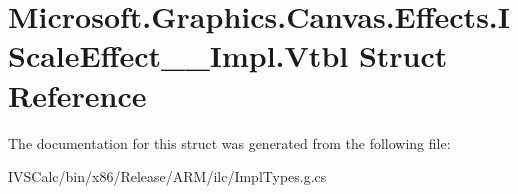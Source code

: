 \hypertarget{struct_microsoft_1_1_graphics_1_1_canvas_1_1_effects_1_1_i_scale_effect_____impl_1_1_vtbl}{}\section{Microsoft.\+Graphics.\+Canvas.\+Effects.\+I\+Scale\+Effect\+\_\+\+\_\+\+Impl.\+Vtbl Struct Reference}
\label{struct_microsoft_1_1_graphics_1_1_canvas_1_1_effects_1_1_i_scale_effect_____impl_1_1_vtbl}


The documentation for this struct was generated from the following file\+:\begin{DoxyCompactItemize}
\item 
I\+V\+S\+Calc/bin/x86/\+Release/\+A\+R\+M/ilc/Impl\+Types.\+g.\+cs\end{DoxyCompactItemize}

